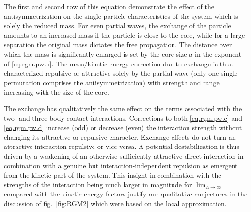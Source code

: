 \documentclass
[aps,nofootinbib,prl,showpacs,twocolumn,groupedaddress,superscriptaddress]
{revtex4}
\newcommand{\toinf}{\ensuremath{\stackrel{\text{\scalebox{0.6}{$\Lambda\to\infty$}}}{\longrightarrow}}}
\newcommand{\figref}[1]{fig.~\ref{#1}}
\begin{document}
%
The first and second row of this equation demonstrate the effect of the antisymmetrization on the single-particle
characteristics of the system which is solely the reduced mass. For even partial waves, the exchange of the particle
amounts to an increased mass if the particle is close to the core, while for a large separation the original
mass dictates the free propagation. The distance over which the mass is significantly enlarged is set by the
core size $a$ in the exponent of \eqref{eq.rgm.pw.b}. The mass/kinetic-energy correction due to exchange is thus
characterized repulsive or attractive solely by the partial wave (only one single permutation comprises the 
antisymmetrization) with strength and range increasing with the size of the core.

The exchange has qualitatively the same effect on the terms associated with the two- and three-body contact interactions.
Corrections to both \eqref{eq.rgm.pw.c} and \eqref{eq.rgm.pw.d} increase (odd) or decrease (even) the interaction
strength without changing its attractive or repulsive character. Exchange effects do not turn an attractive interaction
repulsive or vice versa. A potential destabilization is thus driven by a weakening of an otherwise sufficiently attractive 
direct interaction in combination with a genuine but interaction-independent repulsion as emergent from the
kinetic part of the system. This insight in combination with the strengths of the interaction being
much larger in magnitude for $\lim_{\Lambda\to\infty}$ compared with the kinetic-energy factors justify our qualitative
conjectures in the discussion of \figref{fig:RGM2} which were based on the local approximation.


\end{document}
